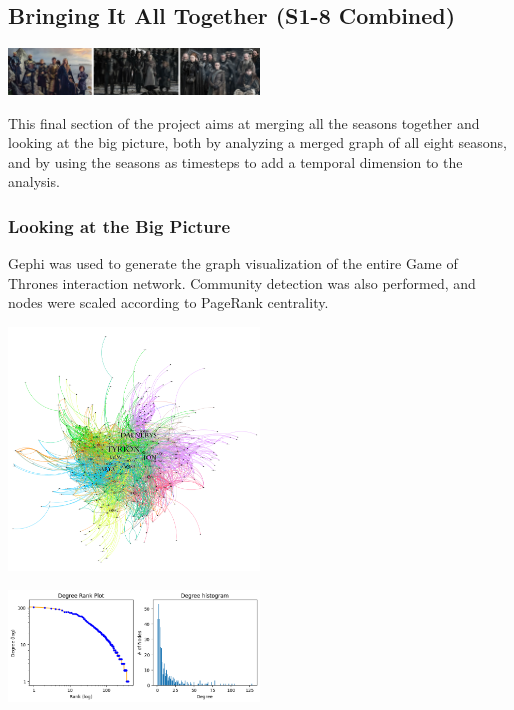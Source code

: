 \documentclass[10pt,twocolumn,letterpaper]{article}
\begin{document}
\subsection{Bringing It All Together (S1-8 Combined)}

\begin{center}
    \includegraphics[width=0.5\textwidth]{img/all_seasons/group_frames.jpg}
\end{center}

This final section of the project aims at merging all the seasons together and looking at the big picture, both by analyzing a merged graph of all eight seasons, and by using the seasons as timesteps to add a temporal dimension to the analysis.

\subsubsection{Looking at the Big Picture}

Gephi was used to generate the graph visualization of the entire Game of Thrones interaction network. Community detection was also performed, and nodes were scaled according to PageRank centrality.

\begin{center}
    \includegraphics[width=0.5\textwidth]{img/all_seasons/gephi_all_seasons_graph.png}
\end{center}

\begin{center}
    \includegraphics[width=0.5\textwidth]{img/all_seasons/degree_plot.jpg}
\end{center}
\end{document}
